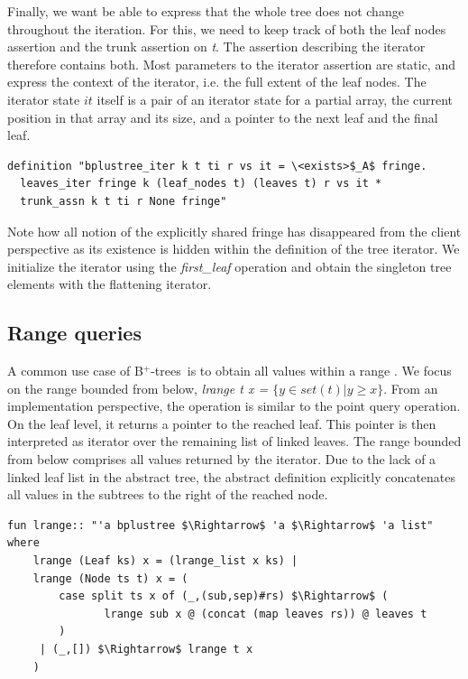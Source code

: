 \documentclass[runningheads]{llncs}
\newcommand{\btrees}{B$^+$-trees}
\begin{document}
Finally, we want be able to express that the whole tree does not change throughout the iteration.
For this, we need to keep track of both the leaf nodes assertion and the trunk assertion on \emph{t}.
The assertion describing the iterator therefore contains both.
Most parameters to the iterator assertion are static, and express the context of the iterator,
i.e. the full extent of the leaf nodes.
The iterator state $it$ itself is a pair of an iterator state for a partial array,
the current position in that array and its size,
and a pointer to the next leaf and the final leaf.

\begin{lstlisting}[mathescape=true, language=Isabelle,label=lst:btree-tree-iter]
definition "bplustree_iter k t ti r vs it = \<exists>$_A$ fringe.
  leaves_iter fringe k (leaf_nodes t) (leaves t) r vs it *
  trunk_assn k t ti r None fringe"
\end{lstlisting}

Note how all notion of the explicitly shared fringe
has disappeared from the client perspective
as its existence is hidden within the definition of the tree iterator.
We initialize the iterator using the \emph{first\_leaf} operation
and obtain the singleton tree elements with the flattening iterator.


\subsection{Range queries}
\label{sec:imperative_range}

A common use case of \btrees\ is
to obtain all values within a range \cite{DBLP:journals/ftdb/Graefe11}.
We focus on the range bounded from below, \emph{lrange t x = $\{y \in set(t) | y \geq x\}$}.
From an implementation perspective, the operation is similar to the point query operation.
On the leaf level, it returns a pointer to the reached leaf.
This pointer is then interpreted as iterator over the remaining list of linked leaves.
The range bounded from below comprises all values returned by the iterator.
Due to the lack of a linked leaf list in the abstract tree,
the abstract definition explicitly concatenates all values in the subtrees 
to the right of the reached node.

\begin{lstlisting}[mathescape=true, language=Isabelle,label=lst:btree-lrange]
fun lrange:: "'a bplustree $\Rightarrow$ 'a $\Rightarrow$ 'a list" where
    lrange (Leaf ks) x = (lrange_list x ks) |
    lrange (Node ts t) x = (
        case split ts x of (_,(sub,sep)#rs) $\Rightarrow$ (
               lrange sub x @ (concat (map leaves rs)) @ leaves t
        )
     | (_,[]) $\Rightarrow$ lrange t x
    )
\end{lstlisting}
  
\end{document}
